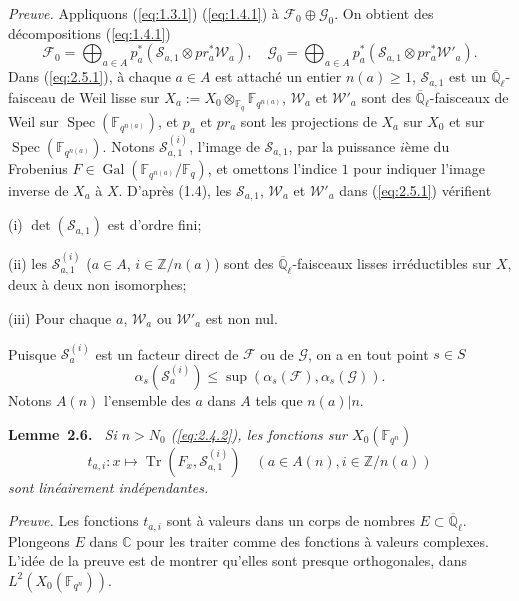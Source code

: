 \documentclass[11pt,a4paper]{article}
\makeatletter
\theoremstyle{plain}
\theoremstyle{definition}
\newenvironment{manualblock}[4]{%
  \par\medskip\noindent\textbf{#1~#2#3.}\def\@currentlabel{#2}\label{#4}\itshape\ }{\par\normalfont\medskip}
\DeclareMathOperator{\Spec}{Spec}
\DeclareMathOperator{\Gal}{Gal}
\DeclareMathOperator{\tr}{Tr}
\makeatother
\begin{document}
\noindent\textit{Preuve.} Appliquons (\ref{eq:1.3.1}) (\ref{eq:1.4.1}) \`a $\mathcal{F}_0 \oplus \mathcal{G}_0$. On obtient des d\'ecompositions (\ref{eq:1.4.1})
\begin{equation}\label{eq:2.5.1}
\mathcal{F}_0 = \bigoplus_{a \in A} p_a^*(\mathcal{S}_{a,1} \otimes pr_a^* \mathcal{W}_a), \quad \mathcal{G}_0 = \bigoplus_{a \in A} p_a^*(\mathcal{S}_{a,1} \otimes pr_a^* \mathcal{W}'_a).
\end{equation}
Dans (\ref{eq:2.5.1}), \`a chaque $a \in A$ est attach\'e un entier $n(a) \geq 1$, $\mathcal{S}_{a,1}$ est un $\overline{\mathbb{Q}}_\ell$-faisceau de Weil lisse sur $X_a := X_0 \otimes_{\mathbb{F}_q} \mathbb{F}_{q^{n(a)}}$, $\mathcal{W}_a$ et $\mathcal{W}'_a$ sont des $\overline{\mathbb{Q}}_\ell$-faisceaux de Weil sur $\Spec(\mathbb{F}_{q^{n(a)}})$, et $p_a$ et $pr_a$ sont les projections de $X_a$ sur $X_0$ et sur $\Spec(\mathbb{F}_{q^{n(a)}})$. Notons $\mathcal{S}_{a,1}^{(i)}$, l'image de $\mathcal{S}_{a,1}$, par la puissance $i$\`eme du Frobenius $F \in \Gal(\mathbb{F}_{q^{n(a)}}/\mathbb{F}_q)$, et omettons l'indice $1$ pour indiquer l'image inverse de $X_a$ \`a $X$. D'apr\`es (1.4), les $\mathcal{S}_{a,1}$, $\mathcal{W}_a$ et $\mathcal{W}'_a$ dans (\ref{eq:2.5.1}) v\'erifient

(i) $\det(\mathcal{S}_{a,1})$ est d'ordre fini;

(ii) les $\mathcal{S}_{a,1}^{(i)}$ ($a \in A$, $i \in \mathbb{Z}/n(a)$) sont des $\overline{\mathbb{Q}}_\ell$-faisceaux lisses irr\'eductibles sur $X$, deux \`a deux non isomorphes;

(iii) Pour chaque $a$, $\mathcal{W}_a$ ou $\mathcal{W}'_a$ est non nul.

Puisque $\mathcal{S}_a^{(i)}$ est un facteur direct de $\mathcal{F}$ ou de $\mathcal{G}$, on a en tout point $s \in S$
\[
\alpha_s(\mathcal{S}_a^{(i)}) \leq \sup(\alpha_s(\mathcal{F}), \alpha_s(\mathcal{G})).
\]
Notons $A(n)$ l'ensemble des $a$ dans $A$ tels que $n(a) | n$.

\begin{manualblock}{Lemme}{2.6}{}{lem:2.6}
Si $n > N_0$ (\ref{eq:2.4.2}), les fonctions sur $X_0(\mathbb{F}_{q^n})$
\[
t_{a,i}: x \mapsto \tr(F_x, \mathcal{S}_{a,1}^{(i)}) \quad (a \in A(n), i \in \mathbb{Z}/n(a))
\]
sont lin\'eairement ind\'ependantes.
\end{manualblock}

\noindent\textit{Preuve.} Les fonctions $t_{a,i}$ sont \`a valeurs dans un corps de nombres $E \subset \overline{\mathbb{Q}}_\ell$. Plongeons $E$ dans $\mathbb{C}$ pour les traiter comme des fonctions \`a valeurs complexes. L'id\'ee de la preuve est de montrer qu'elles sont presque orthogonales, dans $L^2(X_0(\mathbb{F}_{q^n}))$.
\end{document}
